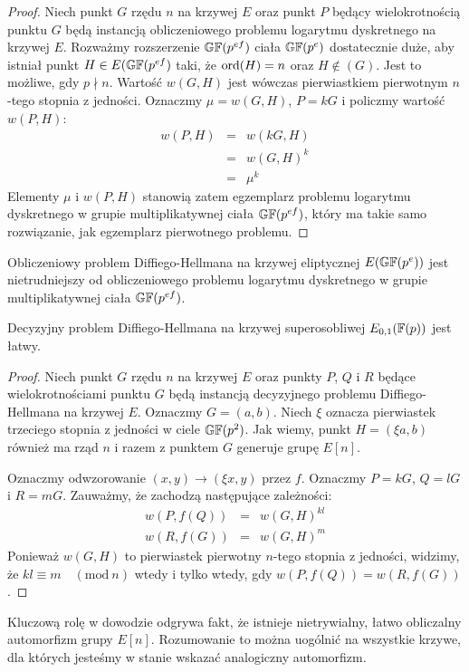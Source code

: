 \begin{proof}
Niech punkt $G$ rzędu $n$ na krzywej $E$
oraz punkt $P$ będący wielokrotnością punktu $G$
będą instancją obliczeniowego problemu logarytmu dyskretnego na krzywej $E$.
Rozważmy rozszerzenie $\mathbb{GF}(p^{ef})$ ciała $\mathbb{GF}(p^e)$ dostatecznie duże,
aby istniał punkt $H \in E(\mathbb{GF}(p^{ef})$ taki,
że $\operatorname{ord}(H) = n$ oraz $H \notin (G)$.
Jest to możliwe, gdy $p \nmid n$.
Wartość $w(G, H)$ jest wówczas
pierwiastkiem pierwotnym $n$-tego stopnia z jedności.
Oznaczmy $\mu = w(G, H)$, $P = kG$ i policzmy wartość $w(P, H)$:
\begin{eqnarray*}
w(P, H)
& = & w(kG, H) \\
& = & w(G, H)^k \\
& = & \mu^k
\end{eqnarray*}
Elementy $\mu$ i $w(P, H)$ stanowią zatem
egzemplarz problemu logarytmu dyskretnego
w grupie multiplikatywnej ciała $\mathbb{GF}(p^{ef})$,
który ma takie samo rozwiązanie, jak egzemplarz pierwotnego problemu.
\end{proof}

\begin{corollary}
Obliczeniowy problem Diffiego-Hellmana na krzywej eliptycznej $E(\mathbb{GF}(p^e))$
jest nietrudniejszy od obliczeniowego problemu logarytmu dyskretnego
w grupie multiplikatywnej ciała $\mathbb{GF}(p^{ef})$.
\end{corollary}

\begin{theorem}
Decyzyjny problem Diffiego-Hellmana
na krzywej superosobliwej \linebreak $E_{0,1}(\mathbb{F}(p))$
jest łatwy.
\end{theorem}

\begin{proof}
Niech punkt $G$ rzędu $n$ na krzywej $E$
oraz punkty $P$, $Q$ i $R$ będące wielokrotnościami punktu $G$
będą instancją decyzyjnego problemu Diffiego-Hellmana na krzywej $E$.
Oznaczmy $G = (a, b)$.
Niech $\xi$ oznacza pierwiastek trzeciego stopnia z jedności w ciele $\mathbb{GF}(p^2)$.
Jak wiemy, punkt $H = (\xi a, b)$ również ma rząd $n$
i razem z punktem $G$ generuje grupę $E[n]$.

\noindent
Oznaczmy odwzorowanie $(x, y) \to (\xi x, y)$ przez $f$.
Oznaczmy $P = kG$, $Q = lG$ i $R = mG$.
Zauważmy, że zachodzą następujące zależności:
\begin{eqnarray*}
w(P, f(Q)) & = & w(G, H)^{kl} \\
w(R, f(G)) & = & w(G, H)^m
\end{eqnarray*}
Ponieważ $w(G, H)$ to pierwiastek pierwotny $n$-tego stopnia z jedności,
widzimy, że $kl \equiv m \quad (\mathrm{mod}\ n)$ wtedy i tylko wtedy, gdy
$w(P, f(Q)) = w(R, f(G))$.
\end{proof}

\begin{remark}
Kluczową rolę w dowodzie odgrywa fakt,
że istnieje nietrywialny, łatwo obliczalny automorfizm grupy $E[n]$.
Rozumowanie to można uogólnić na wszystkie krzywe,
dla których jesteśmy w stanie wskazać analogiczny automorfizm.
\end{remark}

